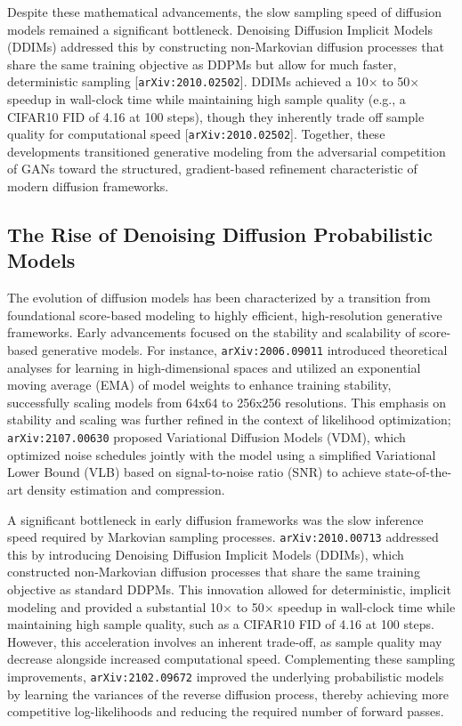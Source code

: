 \documentclass[11pt]{article}
\begin{document}
Despite these mathematical advancements, the slow sampling speed of diffusion models remained a significant bottleneck. Denoising Diffusion Implicit Models (DDIMs) addressed this by constructing non-Markovian diffusion processes that share the same training objective as DDPMs but allow for much faster, deterministic sampling [\texttt{arXiv:2010.02502}]. DDIMs achieved a 10× to 50× speedup in wall-clock time while maintaining high sample quality (e.g., a CIFAR10 FID of 4.16 at 100 steps), though they inherently trade off sample quality for computational speed [\texttt{arXiv:2010.02502}]. Together, these developments transitioned generative modeling from the adversarial competition of GANs toward the structured, gradient-based refinement characteristic of modern diffusion frameworks.

\subsection{The Rise of Denoising Diffusion Probabilistic Models}

The evolution of diffusion models has been characterized by a transition from foundational score-based modeling to highly efficient, high-resolution generative frameworks. Early advancements focused on the stability and scalability of score-based generative models. For instance, \texttt{arXiv:2006.09011} introduced theoretical analyses for learning in high-dimensional spaces and utilized an exponential moving average (EMA) of model weights to enhance training stability, successfully scaling models from 64x64 to 256x256 resolutions. This emphasis on stability and scaling was further refined in the context of likelihood optimization; \texttt{arXiv:2107.00630} proposed Variational Diffusion Models (VDM), which optimized noise schedules jointly with the model using a simplified Variational Lower Bound (VLB) based on signal-to-noise ratio (SNR) to achieve state-of-the-art density estimation and compression.

A significant bottleneck in early diffusion frameworks was the slow inference speed required by Markovian sampling processes. \texttt{arXiv:2010.00713} addressed this by introducing Denoising Diffusion Implicit Models (DDIMs), which constructed non-Markovian diffusion processes that share the same training objective as standard DDPMs. This innovation allowed for deterministic, implicit modeling and provided a substantial 10× to 50× speedup in wall-clock time while maintaining high sample quality, such as a CIFAR10 FID of 4.16 at 100 steps. However, this acceleration involves an inherent trade-off, as sample quality may decrease alongside increased computational speed. Complementing these sampling improvements, \texttt{arXiv:2102.09672} improved the underlying probabilistic models by learning the variances of the reverse diffusion process, thereby achieving more competitive log-likelihoods and reducing the required number of forward passes.
\end{document}
